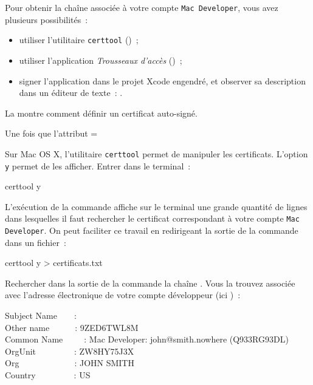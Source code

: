 Pour obtenir la chaîne associée à votre compte \texttt{Mac Developer}, vous avez plusieurs possibilités~:
\begin{itemize}
  \item utiliser l'utilitaire \texttt{certtool} ()~;
  \item utiliser l'application \emph{Trousseaux d'accès} ()~;
  \item signer l'application dans le projet Xcode engendré, et observer sa description dans un éditeur de texte~: .
\end{itemize}

La  montre comment définir un certificat auto-signé. 

Une fois que l'attribut \ggs=%


Sur Mac OS X, l'utilitaire \texttt{certtool} permet de manipuler les certificats. L'option \texttt{y} permet de les afficher. Entrer dans le terminal~:
\begin{SHELL}
certtool y
\end{SHELL}
L'exécution de la commande affiche sur le terminal une grande quantité de lignes dans lesquelles il faut rechercher le certificat correspondant à votre compte  \texttt{Mac Developer}. On peut faciliter ce travail en redirigeant la sortie de la commande dans un fichier~: 
\begin{SHELL}
certtool y > certificats.txt
\end{SHELL}

Rechercher dans la sortie de la commande la chaîne . Vous la trouvez associée avec l'adresse électronique de votre compte développeur (ici )~:
\begin{SHELL}
Subject Name~~~~:\\
Other name~~~~~~: 9ZED6TWL8M\\
Common Name~~~~~: Mac Developer: john@smith.nowhere (Q933RG93DL)\\
OrgUnit~~~~~~~~~: ZW8HY75J3X\\
Org~~~~~~~~~~~~~: JOHN SMITH\\
Country~~~~~~~~~: US
\end{SHELL}

